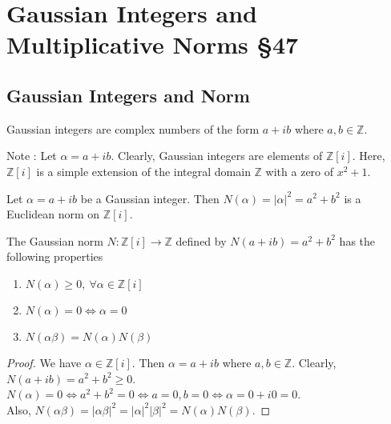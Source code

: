 \section{Gaussian Integers and Multiplicative Norms \S47}
\subsection{Gaussian Integers and Norm}
\begin{definition}
	Gaussian integers are complex numbers of the form $a+ib$ where $a,b \in \mathbb{Z}$.
\end{definition}
Note : Let $\alpha = a+ib$.
Clearly, Gaussian integers are elements of $\mathbb{Z}[i]$.
Here, $\mathbb{Z}[i]$ is a simple extension of the integral domain $\mathbb{Z}$ with a zero of $x^2+1$.

\begin{definition}
	Let $\alpha = a+ib$ be a Gaussian integer.
	Then $N(\alpha) = |\alpha|^2 = a^2+b^2$ is a Euclidean norm on $\mathbb{Z}[i]$.
\end{definition}

\begin{lemma}
	The Gaussian norm $N : \mathbb{Z}[i] \to \mathbb{Z}$ defined by $N(a+ib) = a^2+b^2$ has the following properties
	\begin{enumerate}
		\item $N(\alpha) \ge 0,\ \forall \alpha \in \mathbb{Z}[i]$
		\item $N(\alpha) = 0 \iff \alpha = 0$
		\item $N(\alpha\beta) = N(\alpha)N(\beta)$
	\end{enumerate}
\end{lemma}
\begin{proof}
	We have $\alpha \in \mathbb{Z}[i]$.
	Then $\alpha = a+ib$ where $a,b \in \mathbb{Z}$.
	Clearly, $N(a+ib) = a^2+b^2 \ge 0$.\\

	$N(\alpha) = 0 \iff a^2+b^2 = 0 \iff a=0,b=0 \iff \alpha = 0+i0 = 0$.\\

	Also, $N(\alpha\beta) = |\alpha\beta|^2 = |\alpha|^2 |\beta|^2 = N(\alpha)N(\beta)$.
\end{proof}

